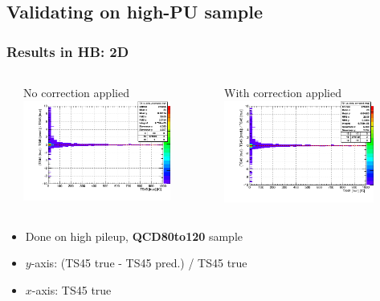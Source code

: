 \documentclass[bigger]{beamer}
\providecommand{\alert}[1]{\textbf{#1}}
\begin{document}
\subsection{Validating on high-PU sample}
\label{sec-3-3}
\begin{frame}
\frametitle{Results in HB: 2D}
\label{sec-3-3-1}
\begin{columns} %
\label{sec-3-3-1-1}
\begin{column}{0.55\textwidth}
\label{sec-3-3-1-1-1}

\centering
No correction applied
\includegraphics[width=0.8\textwidth]{fig/delta_uncorrected_QCD80to120_ring_0.png}
\end{column}
\begin{column}{0.55\textwidth}
\label{sec-3-3-1-1-2}

\centering
With correction applied
\includegraphics[width=0.8\textwidth]{fig/delta_corrected_QCD80to120_ring_0.png}
\end{column}
\end{columns}
\label{sec-3-3-1-2}
\begin{itemize}

\item Done on high pileup, \alert{QCD80to120} sample
\label{sec-3-3-1-2-1}%

\item $y$-axis: (TS45 true - TS45 pred.) / TS45 true
\label{sec-3-3-1-2-2}%

\item $x$-axis: TS45 true
\label{sec-3-3-1-2-3}%
\end{itemize} %
\end{frame}
\end{document}
